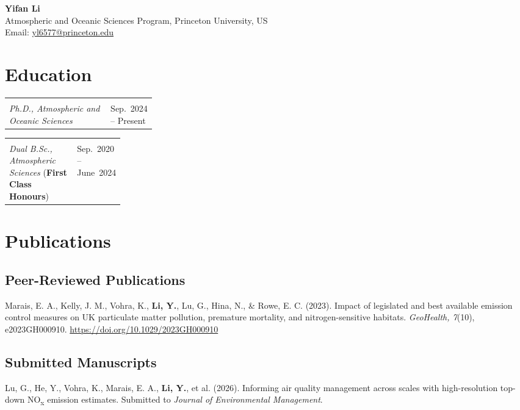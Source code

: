 \documentclass[11pt,a4paper]{article}
\makeatletter
\newcommand{\datedentry}[3][0.28]{%
  \noindent
  \begin{tabularx}{\linewidth}{@{}>{\raggedright\arraybackslash}X >{\raggedleft\arraybackslash}p{#1\linewidth}@{}}
    #2 & #3
  \end{tabularx}\par
}
\newcommand{\publication}[1]{%
  \Needspace{4\baselineskip}
  \par\noindent #1\par
}
\makeatother
\begin{document}
\begin{center}
  {\LARGE\bfseries Yifan Li}\\[4pt]
  Atmospheric and Oceanic Sciences Program, Princeton University, US\\[2pt]
  Email: \href{mailto:yl6577@princeton.edu}{yl6577@princeton.edu}
\end{center}

\section*{Education}

\datedentry{\begin{minipage}[t]{\linewidth}
  \textbf{Princeton University}\\
  \textit{Ph.D., Atmospheric and Oceanic Sciences}
\end{minipage}}{Sep.~2024 -- Present}

\datedentry[0.22]{\begin{minipage}[t]{\linewidth}
  {\fontsize{10.5}{12.5}\selectfont\textbf{\mbox{University of Reading \& Nanjing University of Information Science and Technology}}}\\
  \textit{Dual B.Sc., Atmospheric Sciences} (\textbf{First Class Honours})
\end{minipage}}{Sep.~2020 -- June~2024}

\section*{Publications}

\subsection*{Peer-Reviewed Publications}

\publication{Marais, E. A., Kelly, J. M., Vohra, K., \textbf{Li, Y.}, Lu, G., Hina, N., \& Rowe, E. C. (2023). Impact of legislated and best available emission control measures on UK particulate matter pollution, premature mortality, and nitrogen-sensitive habitats. \textit{GeoHealth, 7}(10), e2023GH000910. \url{https://doi.org/10.1029/2023GH000910}}

\subsection*{Submitted Manuscripts}

\publication{Lu, G., He, Y., Vohra, K., Marais, E. A., \textbf{Li, Y.}, et al. (2026). Informing air quality management across scales with high-resolution top-down NO\textsubscript{x} emission estimates. Submitted to \textit{Journal of Environmental Management}.}
\end{document}
